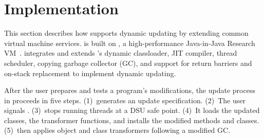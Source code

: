
\section{Implementation}
\label{sec:implementation}

This section describes how \JV supports dynamic updating by extending
common virtual machine services.  \JV is built on \RVM, a
high-performance Java-in-Java Research VM~\cite{AAB+:99,VMperf:webpage}.
\JV integrates and extends \RVM's dynamic classloader, JIT compiler,
thread scheduler, copying garbage collector (GC), and support for return
barriers and on-stack replacement to implement dynamic updating.

After the user prepares and tests a program's modifications, the update
process in \JV proceeds in five steps.  (1)~\UPT generates an update
specification.  (2)~The user signals \JV.  (3)~\JV stops running threads
at a DSU safe point. (4)~It loads the updated classes, the transformer
functions, and installs the modified methods and classes.  (5)~\JV then
applies object and class transformers following a modified GC\@.
